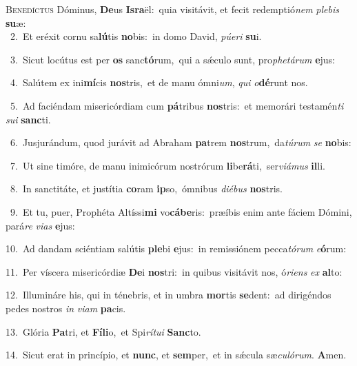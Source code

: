 \lettrine{\initial\textcolor{\initialcolor}{B}}{enedíctus} Dóminus, \textbf{De}\-us \textbf{Is}\-\textbf{ra}ël:~\star quia visitávit, et fecit redemptió\textit{nem} \textit{ple}\-\textit{bis} \textbf{su}\-æ:\\
{\numbfont\textcolor{\numbcolor}{~2.}}~Et eréxit cornu sa\-\textbf{lú}\-tis \textbf{no}\-bis:~\star in domo David, \textit{pú}\-\textit{e}\textit{ri} \textbf{su}\-i.\par
{\numbfont\textcolor{\numbcolor}{~3.}}~Sicut locútus est per \textbf{os} sanc\-\textbf{tó}\-rum,~\star qui a sǽculo sunt, pro\-\textit{phe}\-\textit{tá}\textit{rum} \textbf{e}\-jus:\par
{\numbfont\textcolor{\numbcolor}{~4.}}~Salútem ex ini\-\textbf{mí}\-cis \textbf{nos}\-tris,~\star et de manu ómni\-\textit{um}\-, \textit{qui} \textit{o}\-\textbf{dé}runt nos.\par
{\numbfont\textcolor{\numbcolor}{~5.}}~Ad faciéndam misericórdiam cum \textbf{pá}\-tribus \textbf{nos}\-tris:~\star et memorári testamén\textit{ti} \textit{su}\-\textit{i} \textbf{sanc}\-ti.\par
{\numbfont\textcolor{\numbcolor}{~6.}}~Jusjurándum, quod jurávit ad Abraham \textbf{pa}\-trem \textbf{nos}\-trum,~\star da\-\textit{tú}\-\textit{rum} \textit{se} \textbf{no}\-bis:\par
{\numbfont\textcolor{\numbcolor}{~7.}}~Ut sine timóre, de manu inimicórum nostrórum \textbf{li}\-be\-\textbf{rá}\-ti,~\star ser\-\textit{vi}\-\textit{á}\textit{mus} \textbf{il}\-li.\par
{\numbfont\textcolor{\numbcolor}{~8.}}~In sanctitáte, et justítia \textbf{co}\-ram \textbf{ip}\-so,~\star ómnibus \textit{di}\-\textit{é}\textit{bus} \textbf{nos}\-tris.\par
{\numbfont\textcolor{\numbcolor}{~9.}}~Et tu, puer, Prophéta Altíssi\textbf{mi} vo\-\textbf{cá}\-\textbf{be}ris:~\star præíbis enim ante fáciem Dómini, pará\textit{re} \textit{vi}\-\textit{as} \textbf{e}\-jus:\par
{\numbfont\textcolor{\numbcolor}{10.}}~Ad dandam sciéntiam salútis \textbf{ple}\-bi \textbf{e}\-jus:~\star in remissiónem pecca\-\textit{tó}\-\textit{rum} \textit{e}\-\textbf{ó}rum:\par
{\numbfont\textcolor{\numbcolor}{11.}}~Per víscera misericórdiæ \textbf{De}\-i \textbf{nos}\-tri:~\star in quibus visitávit nos, ó\-\textit{ri}\-\textit{ens} \textit{ex} \textbf{al}\-to:\par
{\numbfont\textcolor{\numbcolor}{12.}}~Illumináre his, qui in ténebris, et in umbra \textbf{mor}\-tis \textbf{se}\-dent:~\star ad dirigéndos pedes nostros \textit{in} \textit{vi}\-\textit{am} \textbf{pa}\-cis.\par
{\numbfont\textcolor{\numbcolor}{13.}}~Glória \textbf{Pa}\-tri, et \textbf{Fí}\-\textbf{li}o,~\star et Spi\-\textit{rí}\-\textit{tu}\textit{i} \textbf{Sanc}\-to.\par
{\numbfont\textcolor{\numbcolor}{14.}}~Sicut erat in princípio, et \textbf{nunc}\-, et \textbf{sem}\-per,~\star et in sǽcula sæ\-\textit{cu}\-\textit{ló}\textit{rum}. \textbf{A}\-men.\par
